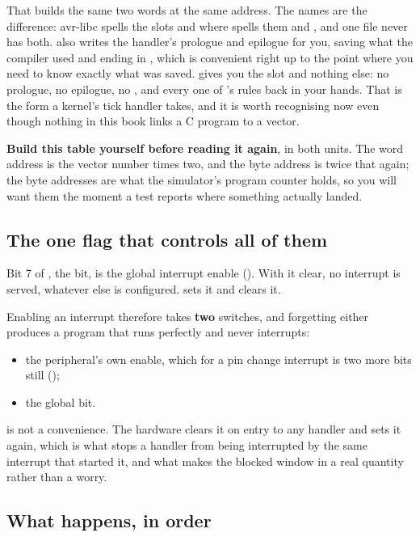 That builds the same two words at the same address. The names are the difference: avr-libc spells
the slots  and  where  spells them
 and , and one file never has both.  also writes the
handler's prologue and epilogue for you, saving what the compiler used and ending in ,
which is convenient right up to the point where you need to know exactly what was saved.
 gives you the slot and nothing else: no prologue, no epilogue, no
, and every one of 's rules back in your hands. That is the form a
kernel's tick handler takes, and it is worth recognising now even though nothing in this book links
a C program to a vector.

\textbf{Build this table yourself before reading it again}, in both units. The word address is the
vector number times two, and the byte address is twice that again; the byte addresses are what the
simulator's program counter holds, so you will want them the moment a test reports where something
actually landed.

\subsection{The one flag that controls all of them}
\label{c3:sec:iflag}
Bit 7 of , the  bit, is the global interrupt enable (). With
it clear, no interrupt is served, whatever else is configured.  sets it and 
clears it.

Enabling an interrupt therefore takes \textbf{two} switches, and forgetting either produces a
program that runs perfectly and never interrupts:
\begin{itemize}
  \item the peripheral's own enable, which for a pin change interrupt is two more bits still
    ();
  \item the global  bit.
\end{itemize}

 is not a convenience. The hardware clears it on entry to any handler and  sets
it again, which is what stops a handler from being interrupted by the same interrupt that started
it, and what makes the blocked window in  a real quantity rather than a
worry.

\subsection{What happens, in order}
\label{c3:sec:sequence}

